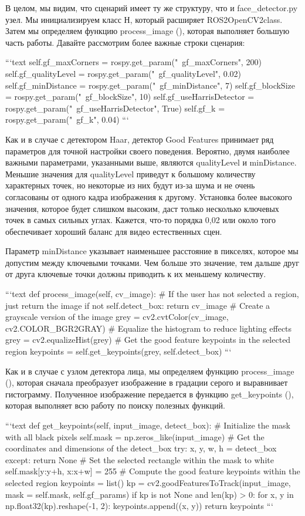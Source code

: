 В целом, мы видим, что сценарий имеет ту же структуру, что и face\_detector.py узел. Мы инициализируем класс Н, который расширяет ROS2OpenCV2class. Затем мы определяем функцию process\_image (), которая выполняет большую часть работы. Давайте рассмотрим более важные строки сценария:

```text
self.gf_maxCorners = rospy.get_param("~gf_maxCorners", 200)
self.gf_qualityLevel = rospy.get_param("~gf_qualityLevel", 0.02)
self.gf_minDistance = rospy.get_param("~gf_minDistance", 7)
self.gf_blockSize = rospy.get_param("~gf_blockSize", 10)
self.gf_useHarrisDetector =
rospy.get_param("~gf_useHarrisDetector", True)
self.gf_k = rospy.get_param("~gf_k", 0.04)
```

Как и в случае с детектором Haar, детектор Good Features принимает ряд параметров для точной настройки своего поведения. Вероятно, двумя наиболее важными параметрами, указанными выше, являются qualityLevel и minDistance. Меньшие значения для qualityLevel приведут к большому количеству характерных точек, но некоторые из них будут из-за шума и не очень согласованы от одного кадра изображения к другому. Установка более высокого значения, которое будет слишком высоким, даст только несколько ключевых точек в самых сильных углах. Кажется, что-то порядка 0,02 или около того обеспечивает хороший баланс для видео естественных сцен.

Параметр minDistance указывает наименьшее расстояние в пикселях, которое мы допустим между ключевыми точками. Чем больше это значение, тем дальше друг от друга ключевые точки должны приводить к их меньшему количеству.

```text
def process_image(self, cv_image):
# If the user has not selected a region, just return the image if not self.detect_box:
        return cv_image
        # Create a grayscale version of the image
grey = cv2.cvtColor(cv_image, cv2.COLOR_BGR2GRAY)
# Equalize the histogram to reduce lighting effects
grey = cv2.equalizeHist(grey)
# Get the good feature keypoints in the selected region
keypoints = self.get_keypoints(grey, self.detect_box)
```

Как и в случае с узлом детектора лица, мы определяем функцию process\_image (), которая сначала преобразует изображение в градации серого и выравнивает гистограмму. Полученное изображение передается в функцию get\_keypoints (), которая выполняет всю работу по поиску полезных функций.

```text
def get_keypoints(self, input_image, detect_box): # Initialize the mask with all black pixels self.mask = np.zeros_like(input_image)
        # Get the coordinates and dimensions of the detect_box
try:
x, y, w, h = detect_box
        except:
            return None
        # Set the selected rectangle within the mask to white
self.mask[y:y+h, x:x+w] = 255
        # Compute the good feature keypoints within the selected region
keypoints = list()
kp = cv2.goodFeaturesToTrack(input_image, mask = self.mask, \textbf{}self.gf_params)
if kp is not None and len(kp) > 0:
for x, y in np.float32(kp).reshape(-1, 2):
keypoints.append((x, y)) return keypoints
```

